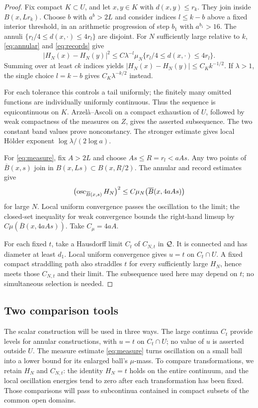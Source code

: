 \begin{proof}
Fix compact $K\subset U$, and let $x,y\in K$ with $d(x,y)\leq r_k$.
They join inside $B(x,Lr_k)$. Choose $b$ with $a^b>2L$ and consider
indices $l\leq k-b$ above a fixed interior threshold, in an arithmetic
progression of step $b_1$ with $a^{b_1}>16$. The annuli
$\{r_l/4\leq d(x,\cdot)\leq4r_l\}$ are disjoint. For $N$
sufficiently large relative to $k$, \eqref{eq:annular} and
\eqref{eq:records} give
\[
 |H_N(x)-H_N(y)|^2\leq C\lambda^{-l}
 \mu_N\{r_l/4\leq d(x,\cdot)\leq4r_l\}.
\]
Summing over at least $ck$ indices yields
$|H_N(x)-H_N(y)|\leq C_Kk^{-1/2}$. If $\lambda>1$, the single
choice $l=k-b$ gives $C_K\lambda^{-k/2}$ instead.

For each tolerance this controls a tail uniformly; the finitely many
omitted functions are individually uniformly continuous. Thus the
sequence is equicontinuous on $K$. Arzel\`a--Ascoli on a compact
exhaustion of $U$, followed by weak compactness of the measures on
$Z$, gives the asserted subsequence. The two constant band values
prove nonconstancy. The stronger estimate gives local H\"older exponent
$\log\lambda/(2\log a)$.

For \eqref{eq:measure}, fix $A>2L$ and choose
$As\leq R=r_l<aAs$. Any two points of $\overline B(x,s)$ join in
$B(x,Ls)\subset B(x,R/2)$. The annular and record estimates give
\[
 \bigl(\operatorname{osc}_{\overline B(x,s)}H_N\bigr)^2
       \leq C\mu_N\bigl(\overline B(x,4aAs)\bigr)
\]
for large $N$. Local uniform convergence passes the oscillation to
the limit; the closed-set inequality for weak convergence bounds the
right-hand limsup by $C\mu(\overline B(x,4aAs))$.
Take $C_\mu=4aA$.

For each fixed $t$, take a Hausdorff limit $C_t$ of $C_{N,t}$ in
$\mathcal Q$. It is connected and has diameter at least $d_1$. Local
uniform convergence gives $u=t$ on $C_t\cap U$. A fixed compact
straddling path also straddles $t$ for every sufficiently large
$H_N$, hence meets those $C_{N,t}$ and their limit. The subsequence
used here may depend on $t$; no simultaneous selection is needed.
\end{proof}

\subsection{Two comparison tools}

The scalar construction will be used in three ways. The large continua
$C_t$ provide levels for annular constructions, with $u=t$ on
$C_t\cap U$; no value of $u$ is asserted outside $U$. The measure
estimate \eqref{eq:measure} turns oscillation on a small ball into a
lower bound for its enlarged ball's $\mu$-mass. To compare
transformations, we retain $H_N$ and $C_{N,t}$: the identity $H_N=t$
holds on the entire continuum, and the local oscillation energies
tend to zero after each transformation has been fixed. Those
comparisons will pass to subcontinua contained in compact subsets of
the common open domains.

